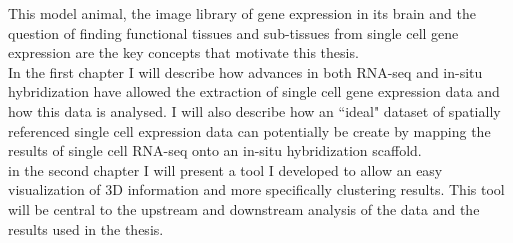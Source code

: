 	This model animal, the image library of gene expression in its brain and the question of finding functional tissues and sub-tissues from single cell gene expression are the key concepts that motivate this thesis.\\
	
	In the first chapter I will describe how advances in both RNA-seq and in-situ hybridization have allowed the extraction of single cell gene expression data and how this data is analysed. I will also describe how an ``ideal" dataset of spatially referenced single cell expression data can potentially be create by mapping the results of single cell RNA-seq onto an in-situ hybridization scaffold.\\
	
	in the second chapter I will present a tool I developed to allow an easy visualization of 3D information and more specifically clustering results. This tool will be central to the upstream and downstream analysis of the data and the results used in the thesis.\\
	
	

%
%
%
%
%



